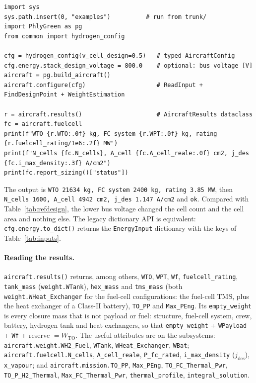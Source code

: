 \documentclass[a4paper,11pt]{article}
\newcommand{\code}[1]{\nolinkurl{#1}}
\newcommand{\jdes}{j_\mathrm{des}}
\begin{document}
\begin{lstlisting}
import sys
sys.path.insert(0, "examples")          # run from trunk/
import PhlyGreen as pg
from common import hydrogen_config

cfg = hydrogen_config(v_cell_design=0.5)   # typed AircraftConfig
cfg.energy.stack_design_voltage = 800.0    # optional: bus voltage [V]
aircraft = pg.build_aircraft()
aircraft.configure(cfg)                    # ReadInput + FindDesignPoint + WeightEstimation

r = aircraft.results()                     # AircraftResults dataclass
fc = aircraft.fuelcell
print(f"WTO {r.WTO:.0f} kg, FC system {r.WPT:.0f} kg, rating {r.fuelcell_rating/1e6:.2f} MW")
print(f"N_cells {fc.N_cells}, A_cell {fc.A_cell_reale:.0f} cm2, j_des {fc.i_max_density:.3f} A/cm2")
print(fc.report_sizing()["status"])
\end{lstlisting}
The output is \code{WTO 21634 kg, FC system 2400 kg, rating 3.85 MW}, then
\code{N_cells 1600, A_cell 4942 cm2, j_des 1.147 A/cm2} and \code{ok}. Compared with
Table~\ref{tab:refdesign}, the lower bus voltage changed the cell count and the cell area and
nothing else. The legacy dictionary API is equivalent: \code{cfg.energy.to_dict()} returns the
\code{EnergyInput} dictionary with the keys of Table~\ref{tab:inputs}.

\paragraph{Reading the results.} \code{aircraft.results()} returns, among others,
\code{WTO}, \code{WPT}, \code{Wf}, \code{fuelcell_rating}, \code{tank_mass}
(\code{weight.WTank}), \code{hex_mass} and \code{tms_mass} (both \code{weight.WHeat_Exchanger}
for the fuel-cell configurations: the fuel-cell TMS, plus the heat exchanger of a Class-II
battery), \code{TO_PP} and \code{Max_PEng}. Its \code{empty_weight} is every closure mass that
is not payload or fuel: structure, fuel-cell system, crew, battery, hydrogen tank and heat
exchangers, so that \code{empty_weight} + \code{WPayload} + \code{Wf} + reserve $=W_\mathrm{TO}$.
The useful attributes are on the subsystems:
\code{aircraft.weight.WH2_Fuel}, \code{WTank}, \code{WHeat_Exchanger}, \code{WBat};
\code{aircraft.fuelcell.N_cells}, \code{A_cell_reale}, \code{P_fc_rated},
\code{i_max_density} ($\jdes$), \code{x_vapour}; and \code{aircraft.mission.TO_PP},
\code{Max_PEng}, \code{TO_FC_Thermal_Pwr}, \code{TO_P_H2_Thermal}, \code{Max_FC_Thermal_Pwr},
\code{thermal_profile}, \code{integral_solution}.
\end{document}
